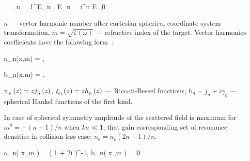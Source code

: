     \eq
		 = \sum_{n = 1}^{\infty}E_n , \qquad E_n = i^{n} E_0 
        \label{E_s_sph}
	\qe

$n$ --- vector harmonic number after cartesian-spherical coordinate system transformation, $m = \sqrt{\varepsilon\left(\omega\right)}$ --- refractive index of the target. Vector harmonics coefficients have the following form~\cite{boren_huffman}:


    \eq
		a_n(x,\:m) = ,
		\label{an_bessel}
	\qe

    \eq
        b_n(x,\:m) = ,
        \label{bn_bessel}
    \qe
    \eqc %
    \cqe %

\noindent ${\psi}_{n}^{} \left( {z} \right) = z {j}_{n}^{} \left( {z} \right)$, ${\xi}_{n}^{} \left( {z} \right) = z {h}_{n}^{} \left( {z} \right)$ --- Riccati-Bessel functions, $h_n = j_n + i \gamma_n$ --- spherical Hankel functions of the first kind. 

In case of spherical symmetry amplitude of the scattered field is maximum for $m^2 = - (n+ 1) / n$ when $ka \ll 1$, that gain corresponding set of resonance densities in collision-less case: $n_e = n_c(2n + 1) / n$.


    \eq
        a_n\left( x ,\:m \right) = \left( 1 + 2i    \right)^{-1}, \qquad b_n\left( x ,\:m \right) = 0
        \label{ab_asymp}
    \qe


